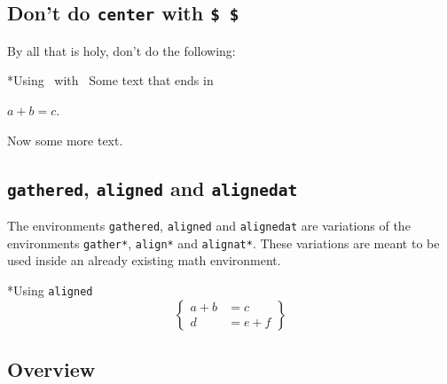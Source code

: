 \subsection{Don’t do \texttt{center} with \texttt{\$ \$}}

By all that is holy, don’t do the following:
\begin{showlatex}*{Using~ with~\inlinecode{\$ \$}}
Some text that ends in
\begin{center}
  $a + b = c$.
\end{center}
Now some more text.
\end{showlatex}



\subsection{\texttt{gathered}, \texttt{aligned} and \texttt{alignedat}}

The environments \texttt{gathered}, \texttt{aligned} and \texttt{alignedat} are variations of the environments \texttt{gather*}, \texttt{align*} and \texttt{alignat*}.
These variations are meant to be used inside an already existing math environment.
\begin{showlatex}*{Using \texttt{aligned}}
\[
  \left\{
    \begin{aligned}
      a + b &= c      \\
      d     &= e + f
    \end{aligned}
  \right\}
\]
\end{showlatex}



\subsection{Overview}

